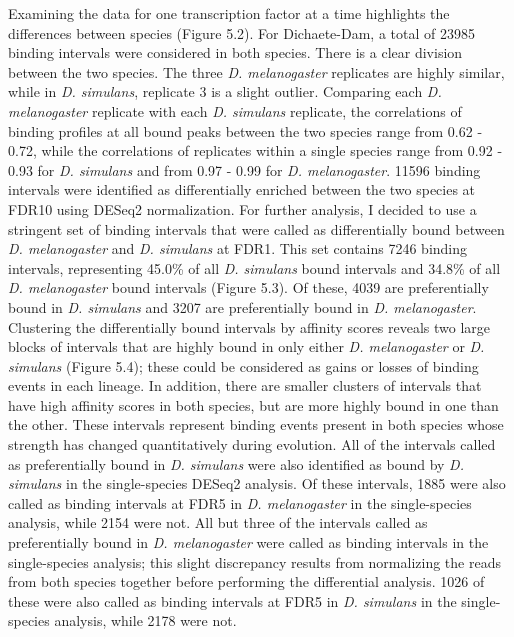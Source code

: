 Examining the data for one transcription factor at a time highlights the differences between species (Figure 5.2). For Dichaete-Dam, a total of 23985 binding intervals were considered in both species. There is a clear division between the two species. The three \emph{D. melanogaster} replicates are highly similar, while in \emph{D. simulans}, replicate 3 is a slight outlier. Comparing each \emph{D. melanogaster} replicate with each \emph{D. simulans} replicate, the correlations of binding profiles at all bound peaks between the two species range from 0.62 - 0.72, while the correlations of replicates within a single species range from 0.92 - 0.93 for \emph{D. simulans} and from 0.97 - 0.99 for \emph{D. melanogaster}. 11596 binding intervals were identified as differentially enriched between the two species at FDR10 using DESeq2 normalization. For further analysis, I decided to use a stringent set of binding intervals that were called as differentially bound between \emph{D. melanogaster} and \emph{D. simulans} at FDR1. This set contains 7246 binding intervals, representing 45.0\% of all \emph{D. simulans} bound intervals and 34.8\% of all \emph{D. melanogaster} bound intervals (Figure 5.3). Of these, 4039 are preferentially bound in \emph{D. simulans} and 3207 are preferentially bound in \emph{D. melanogaster}. Clustering the differentially bound intervals by affinity scores reveals two large blocks of intervals that are highly bound in only either \emph{D. melanogaster} or \emph{D. simulans} (Figure 5.4); these could be considered as gains or losses of binding events in each lineage. In addition, there are smaller clusters of intervals that have high affinity scores in both species, but are more highly bound in one than the other. These intervals represent binding events present in both species whose strength has changed quantitatively during evolution. All of the intervals called as preferentially bound in \emph{D. simulans} were also identified as bound by \emph{D. simulans} in the single-species DESeq2 analysis. Of these intervals, 1885 were also called as binding intervals at FDR5 in \emph{D. melanogaster} in the single-species analysis, while 2154 were not. All but three of the intervals called as preferentially bound in \emph{D. melanogaster} were called as binding intervals in the single-species analysis; this slight discrepancy results from normalizing the reads from both species together before performing the differential analysis. 1026 of these were also called as binding intervals at FDR5 in \emph{D. simulans} in the single-species analysis, while 2178 were not.\\

